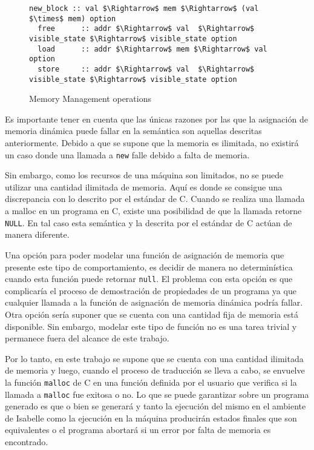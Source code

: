 \begin{figure}
  \begin{lstlisting}[mathescape=true, frame=single]
  new_block :: val $\Rightarrow$ mem $\Rightarrow$ (val $\times$ mem) option
  free      :: addr $\Rightarrow$ val  $\Rightarrow$ visible_state $\Rightarrow$ visible_state option
  load      :: addr $\Rightarrow$ mem $\Rightarrow$ val option
  store     :: addr $\Rightarrow$ val  $\Rightarrow$ visible_state $\Rightarrow$ visible_state option
  \end{lstlisting}

  \caption{Memory Management operations}
  \label{fig:mem_operations}
\end{figure}

Es importante tener en cuenta que las únicas razones por las que la asignación de memoria dinámica puede fallar en la semántica son aquellas descritas anteriormente.
Debido a que se supone que la memoria es ilimitada, no existirá un caso donde una llamada a \verb|new| falle debido a falta de memoria.

Sin embargo, como los recursos de una máquina son limitados, no se puede utilizar una cantidad ilimitada de memoria.
Aquí es donde se consigue una discrepancia con lo descrito por el estándar de C.
Cuando se realiza una llamada a malloc en un programa en C, existe una posibilidad de que la llamada retorne \verb|NULL|.
En tal caso esta semántica y la descrita por el estándar de C actúan de manera diferente.

Una opción para poder modelar una función de asignación de memoria que presente este tipo de comportamiento, es decidir de manera no determinística cuando esta función puede retornar \verb|null|.
El problema con esta opción es que complicaría el proceso de demostración de propiedades de un programa ya que cualquier llamada a la función de asignación de memoria dinámica podría fallar.
Otra opción sería suponer que se cuenta con una cantidad fija de memoria está disponible.
Sin embargo, modelar este tipo de función no es una tarea trivial y permanece fuera del alcance de este trabajo.

Por lo tanto, en este trabajo se supone que se cuenta con una cantidad ilimitada de memoria y luego, cuando el proceso de traducción se lleva a cabo, se envuelve la función \verb|malloc| de C en una función definida por el usuario que verifica si la llamada a \verb|malloc| fue exitosa o no.
Lo que se puede garantizar sobre un programa generado es que o bien se generará y tanto la ejecución del mismo en el ambiente de Isabelle como la ejecución en la máquina producirán estados finales que son equivalentes o el programa abortará si un error por falta de memoria es encontrado.


